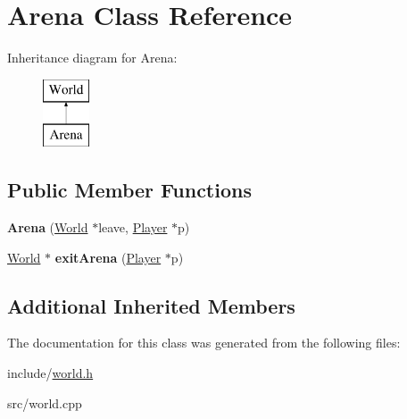 \hypertarget{classArena}{}\section{Arena Class Reference}
\label{classArena}
Inheritance diagram for Arena\+:\begin{figure}[H]
\begin{center}
\leavevmode
\includegraphics[height=2.000000cm]{classArena}
\end{center}
\end{figure}
\subsection*{Public Member Functions}
\begin{DoxyCompactItemize}
\item 
\hypertarget{classArena_a535e3722c259e4629bf779f4865df761}{}{\bfseries Arena} (\hyperlink{classWorld}{World} $\ast$leave, \hyperlink{classPlayer}{Player} $\ast$p)\label{classArena_a535e3722c259e4629bf779f4865df761}

\item 
\hypertarget{classArena_a58230f6c0670c86d9bdd6f79f53915f2}{}\hyperlink{classWorld}{World} $\ast$ {\bfseries exit\+Arena} (\hyperlink{classPlayer}{Player} $\ast$p)\label{classArena_a58230f6c0670c86d9bdd6f79f53915f2}

\end{DoxyCompactItemize}
\subsection*{Additional Inherited Members}


The documentation for this class was generated from the following files\+:\begin{DoxyCompactItemize}
\item 
include/\hyperlink{world_8h}{world.\+h}\item 
src/world.\+cpp\end{DoxyCompactItemize}

